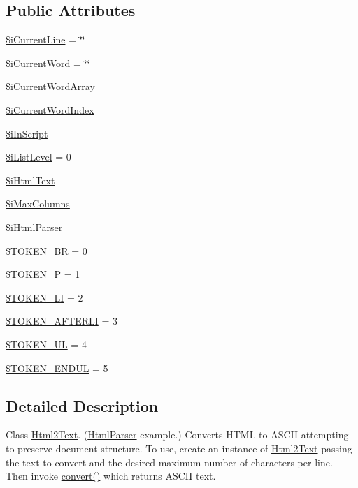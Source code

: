 \subsection*{Public Attributes}
\begin{DoxyCompactItemize}
\item 
\hyperlink{classHtml2Text_a637a7ad288f5f1cb3596e6c30ff7cdd1}{\$i\+Current\+Line} = \char`\"{}\char`\"{}
\item 
\hyperlink{classHtml2Text_a3fcbc8d47ee2d39d7642581a6eaeac3f}{\$i\+Current\+Word} = \char`\"{}\char`\"{}
\item 
\hyperlink{classHtml2Text_a2a3421df2f6c713a6362cc177fc825ee}{\$i\+Current\+Word\+Array}
\item 
\hyperlink{classHtml2Text_afd51143c5a22243e3fdb296b165b75fc}{\$i\+Current\+Word\+Index}
\item 
\hyperlink{classHtml2Text_ad1ac7e0033e7147f70634201d4c75c3a}{\$i\+In\+Script}
\item 
\hyperlink{classHtml2Text_a0550556ecb4b3b5de01eab8044c28784}{\$i\+List\+Level} = 0
\item 
\hyperlink{classHtml2Text_aec57c716088597cbf5ef823a4ad9237d}{\$i\+Html\+Text}
\item 
\hyperlink{classHtml2Text_a0acbcfeaed2a430e528fde413b0549f9}{\$i\+Max\+Columns}
\item 
\hyperlink{classHtml2Text_a22abd87860bf97f5eedbe8849d67a2d8}{\$i\+Html\+Parser}
\item 
\hyperlink{classHtml2Text_a613470e1fb5059e50cd74119fde8932e}{\$\+T\+O\+K\+E\+N\+\_\+\+B\+R} = 0
\item 
\hyperlink{classHtml2Text_a4d94686f1b18fda5460b9a208d89a98d}{\$\+T\+O\+K\+E\+N\+\_\+\+P} = 1
\item 
\hyperlink{classHtml2Text_aadb27ed8819d414ef85c71c3f7f367ba}{\$\+T\+O\+K\+E\+N\+\_\+\+L\+I} = 2
\item 
\hyperlink{classHtml2Text_a7c59649ca668432ae1fa144422a6ae2c}{\$\+T\+O\+K\+E\+N\+\_\+\+A\+F\+T\+E\+R\+L\+I} = 3
\item 
\hyperlink{classHtml2Text_a21920236a8173543887975c3d657a81c}{\$\+T\+O\+K\+E\+N\+\_\+\+U\+L} = 4
\item 
\hyperlink{classHtml2Text_aa5aafc2e0f4c2038185ae09fcc3521d2}{\$\+T\+O\+K\+E\+N\+\_\+\+E\+N\+D\+U\+L} = 5
\end{DoxyCompactItemize}


\subsection{Detailed Description}
Class \hyperlink{classHtml2Text}{Html2\+Text}. (\hyperlink{classHtmlParser}{Html\+Parser} example.) Converts H\+T\+M\+L to A\+S\+C\+I\+I attempting to preserve document structure. To use, create an instance of \hyperlink{classHtml2Text}{Html2\+Text} passing the text to convert and the desired maximum number of characters per line. Then invoke \hyperlink{classHtml2Text_a180ebdd9fc13fa40484f1140288b1a2d}{convert()} which returns A\+S\+C\+I\+I text. 

